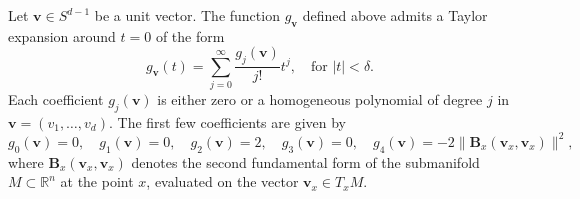\documentclass[10pt,a4paper]{amsart}
\begin{document}
\begin{lem}\label{tmetric}
Let \( \mathbf{v} \in S^{d-1} \) be a unit vector. The function \( g_{\mathbf{v}} \) defined above admits a Taylor expansion around \( t = 0 \) of the form
\[
g_{\mathbf{v}}(t) = \sum_{j=0}^{\infty} \frac{g_j(\mathbf{v})}{j!} t^j, \quad \text{for } |t| < \delta.
\]
Each coefficient \( g_j(\mathbf{v}) \) is either zero or a homogeneous polynomial of degree \( j \) in \( \mathbf{v} = (v_1, \dots, v_d) \). The first few coefficients are given by
\[
g_0(\mathbf{v}) = 0, \quad 
g_1(\mathbf{v}) = 0, \quad 
g_2(\mathbf{v}) = 2, \quad 
g_3(\mathbf{v}) = 0, \quad 
g_4(\mathbf{v}) = -2 \| \mathbf{B}_x(\mathbf{v}_x, \mathbf{v}_x) \|^2,
\]
where \( \mathbf{B}_x(\mathbf{v}_x, \mathbf{v}_x) \) denotes the second fundamental form of the submanifold \( M \subset \mathbb{R}^n \) at the point \( x \), evaluated on the vector \( \mathbf{v}_x \in T_x M \).
\end{lem}
\end{document}
